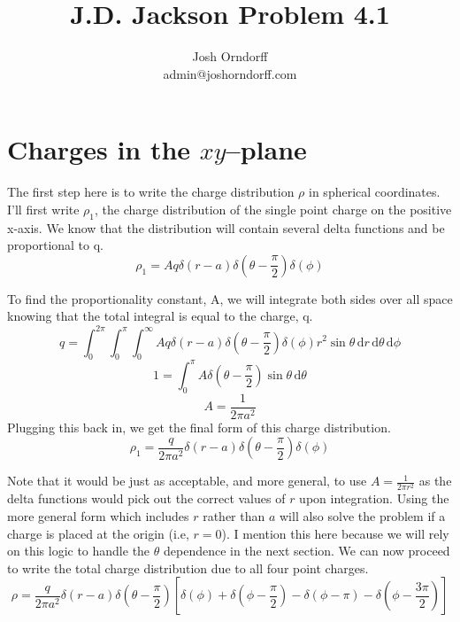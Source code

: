 \documentclass[10pt,a4paper]{article}
\begin{document}
\title{J.D. Jackson Problem 4.1}
\author{Josh Orndorff \\ admin@joshorndorff.com}
\maketitle

\section{Charges in the $xy$--plane}
The first step here is to write the charge distribution $\rho$ in spherical coordinates.  I'll first write $\rho_1$, the charge distribution of the single point charge on the positive x-axis.  We know that the distribution will contain several delta functions and be proportional to q.
\begin{equation}
\rho_1 = Aq\delta(r-a)\delta(\theta-\frac{\pi}{2})\delta(\phi)
\end{equation}

To find the proportionality constant, A, we will integrate both sides over all space knowing that the total integral is equal to the charge, q.
\begin{equation}
q = \int_0^{2\pi}\int_0^\pi\int_0^\infty A q \delta(r-a)\delta(\theta-\frac{\pi}{2})\delta(\phi) r^2 \sin\theta \,\mathrm{d}r\,\mathrm{d}\theta\,\mathrm{d}\phi
\end{equation}
\begin{equation}
1 = \int_0^\pi A \delta(\theta-\frac{\pi}{2}) \sin\theta \,\mathrm{d}\theta
\end{equation}
\begin{equation}
A=\frac{1}{2\pi a^2}
\end{equation}
Plugging this back in, we get the final form of this charge distribution.
\begin{equation}
\rho_1 = \frac{q}{2\pi a^2} \delta(r-a)\delta(\theta-\frac{\pi}{2})\delta(\phi)
\end{equation}

Note that it would be just as acceptable, and more general, to use $A=\frac{1}{2\pi r^2}$ as the delta functions would pick out the correct values of $r$ upon integration.  Using the more general form which includes $r$ rather than $a$ will also solve the problem if a charge is placed at the origin (i.e, $r=0$).  I mention this here because we will rely on this logic to handle the $\theta$ dependence in the next section.
We can now proceed to write the total charge distribution due to all four point charges.
\begin{equation}
\rho = \frac{q}{2\pi a^2} \delta(r-a)\delta(\theta-\frac{\pi}{2})\left[\delta(\phi)+\delta(\phi-\frac{\pi}{2})-\delta(\phi-\pi)-\delta(\phi-\frac{3\pi}{2})\right]
\end{equation}
\end{document}
